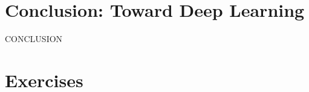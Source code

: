 \FloatBarrier
{}
\section{Conclusion: Toward Deep Learning}
\label{sec:conclusion}

CONCLUSION

\FloatBarrier

\newpage
\section{Exercises}
\label{sec:exercises}

\begin{exercise}\end{exercise}

